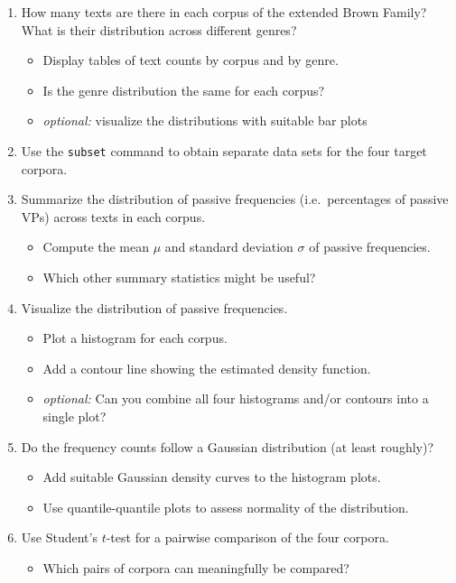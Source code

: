 \documentclass[a4paper,12pt]{article}
\begin{document}
\begin{enumerate}[topsep=0em]
\item How many texts are there in each corpus of the extended Brown Family? What is their distribution across different genres?
  \begin{itemize}[nosep]
  \item Display tables of text counts by corpus and by genre.
  \item Is the genre distribution the same for each corpus?
  \item \emph{optional:} visualize the distributions with suitable bar plots
  \end{itemize}
\item Use the \texttt{subset} command to obtain separate data sets for the four target corpora.
\item Summarize the distribution of passive frequencies (i.e.\ percentages of passive VPs) across texts in each corpus.
  \begin{itemize}[nosep]
  \item Compute the mean $\mu$ and standard deviation $\sigma$ of passive frequencies.
  \item Which other summary statistics might be useful?
  \end{itemize}
\item Visualize the distribution of passive frequencies.
  \begin{itemize}[nosep]
  \item Plot a histogram for each corpus.
  \item Add a contour line showing the estimated density function.
  \item \emph{optional:} Can you combine all four histograms and/or contours into a single plot?
  \end{itemize}
\item Do the frequency counts follow a Gaussian distribution (at least roughly)?
  \begin{itemize}[nosep]
  \item Add suitable Gaussian density curves to the histogram plots.
  \item Use quantile-quantile plots to assess normality of the distribution.
  \end{itemize}
\pagebreak %
\item Use Student's $t$-test for a pairwise comparison of the four corpora.
  \begin{itemize}[nosep]
  \item Which pairs of corpora can meaningfully be compared?

\end{itemize}
\end{enumerate}
\end{document}
